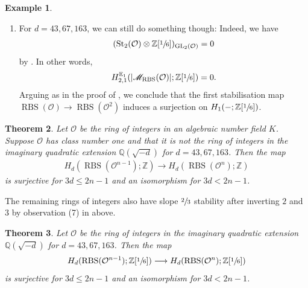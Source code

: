 \documentclass[12pt, reqno]{amsart}
\theoremstyle{plain}
\newtheorem{theorem}{Theorem}[section]
\theoremstyle{definition}
\newtheorem{example}[theorem]{Example}
\newcommand{\Z}{\mathbb Z}
\newcommand{\Q}{\mathbb Q}
\begin{document}
\begin{example}
\begin{enumerate}
that machine computation seems to be the only reasonable approach.'' (\cite[\S 17]{Swan71}).
\item For $d=43, 67, 163$, we can still do something though: Indeed, we have
\begin{align*}
(\operatorname{St}_2(\mathcal{O})\otimes \Z[\sfrac{1}{6}])_{\operatorname{GL}_2(\mathcal{O})}=0
\end{align*}
by \cite[Corollary 5.6]{MillerPatztWilsonYasaki}. In other words,
\begin{align*}
H_{2,1}^{\mathbb{E}_1}(|\mathscr{M}_{\operatorname{RBS}}(\mathcal{O})|; \Z[\sfrac{1}{6}])=0.
\end{align*}
Arguing as in the proof of \cite[Theorem 1]{JansenMiller}, we conclude that the first stabilisation map $\operatorname{RBS}(\mathcal{O})\rightarrow \operatorname{RBS}(\mathcal{O}^2)$ induces a surjection on $H_1(-; \Z[\sfrac{1}{6}])$. \qedhere
\end{enumerate}
\end{example}

\begin{theorem}\label{rings of integers 2/3}
Let $\mathcal{O}$ be the ring of integers in an algebraic number field $K$. Suppose $\mathcal{O}$ has class number one and that it is \textit{not} the ring of integers in the imaginary quadratic extension $\Q(\sqrt{-d})$ for $d=43, 67, 163$. Then the map
\begin{align*}
H_d(\operatorname{RBS}(\mathcal{O}^{n-1}); \Z)\longrightarrow H_d(\operatorname{RBS}(\mathcal{O}^n); \Z)
\end{align*}
is surjective for $3d\leq 2n-1$ and an isomorphism for $3d< 2n-1$. 
\end{theorem}

The remaining rings of integers also have slope $\sfrac{2}{3}$ stability after inverting $2$ and $3$ by observation (7) in  above.

\begin{theorem}\label{rings of integers 2/3 mod 6}
Let $\mathcal{O}$ be the ring of integers in the imaginary quadratic extension $\Q(\sqrt{-d})$ for $d=43, 67, 163$. Then the map
\begin{align*}
H_d(\operatorname{RBS}(\mathcal{O}^{n-1}); \Z[\sfrac{1}{6}])\longrightarrow H_d(\operatorname{RBS}(\mathcal{O}^n); \Z[\sfrac{1}{6}])
\end{align*}
is surjective for $3d\leq 2n-1$ and an isomorphism for $3d< 2n-1$. 
\end{theorem}
\end{document}
